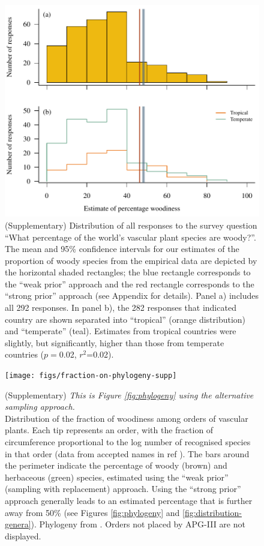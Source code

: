 \documentclass[a4paper,12pt]{article}
\begin{document}
\begin{figure}[p]
  \centering
  \includegraphics{figs/survey-distribution}
  \caption{(Supplementary) Distribution of all responses to the survey
    question ``What percentage of the world's vascular plant species
    are woody?''.
    The mean and 95\% confidence intervals for our estimates of the
    proportion of woody species from the empirical data are depicted
    by the horizontal shaded rectangles; the blue rectangle
    corresponds to the ``weak prior'' approach and the red rectangle
    corresponds to the ``strong prior'' approach (see Appendix for
    details).  
    Panel a) includes all 292 responses.  In panel b), the 282
    responses that indicated country are shown separated into
    ``tropical'' (orange distribution) and ``temperate'' (teal).
    Estimates from tropical countries were slightly, but
    significantly, higher than those from temperate countries
    ($p=$0.02, $r^2$=0.02).
  }

  \label{fig:survey-distribution}
\end{figure}

\begin{figure}[p]
  \centering
  \texttt{[image: figs/fraction-on-phylogeny-supp]}

  \caption{(Supplementary)
    \textit{This is Figure \ref{fig:phylogeny} using the alternative
      sampling approach.}\\
    Distribution of the fraction of woodiness among orders of vascular
    plants.  Each tip represents an order, with the fraction of
    circumference proportional to the log number of recognised species
    in that order (data from accepted names in ref
    \citep{ThePlantList}).  The bars around the perimeter indicate the
    percentage of woody (brown) and herbaceous (green) species,
    estimated using the ``weak prior'' (sampling with replacement)
    approach.  Using the ``strong prior'' approach generally leads to
    an estimated percentage that is further away from 50\% (see
    Figures \ref{fig:phylogeny} and \ref{fig:distribution-genera}).
    Phylogeny from \citep{Zanne}.  Orders not placed by APG-III
    \citep{APG3} are not displayed.}
  \label{fig:phylogeny-supp}
\end{figure}
\end{document}

